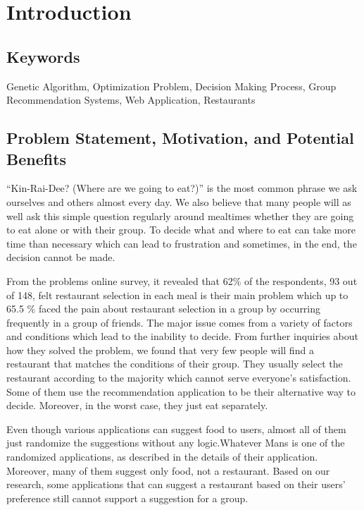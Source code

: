 \documentclass[12pt,oneside,openright,a4paper]{cpe-english-project}
\begin{document}



\chapter{Introduction}

\section{Keywords} 

Genetic Algorithm, Optimization Problem, Decision Making Process, Group Recommendation Systems, Web Application, Restaurants

\section{Problem Statement, Motivation, and Potential Benefits} 

“Kin-Rai-Dee? (Where are we going to eat?)” is the most common phrase we ask ourselves and others almost every day. We also believe that many people will as well ask this simple question regularly around mealtimes whether they are going to eat alone or with their group. To decide what and where to eat can take more time than necessary which can lead to frustration and sometimes, in the end, the decision cannot be made.

From the problems online survey, it revealed that 62\% of the respondents, 93 out of 148, felt restaurant selection in each meal is their main problem which up to 65.5 \% faced the pain about restaurant selection in a group by occurring frequently in a group of friends. The major issue comes from a variety of factors and conditions which lead to the inability to decide. From further inquiries about how they solved the problem, we found that very few people will find a restaurant that matches the conditions of their group. They usually select the restaurant according to the majority which cannot serve everyone’s satisfaction. Some of them use the recommendation application to be their alternative way to decide. Moreover, in the worst case, they just eat separately. 

Even though various applications can suggest food to users, almost all of them just randomize the suggestions without any logic.Whatever Mans is one of the randomized applications, as described in the details of their application. Moreover, many of them suggest only food, not a restaurant. Based on our research, some applications that can suggest a restaurant based on their users’ preference still cannot support a suggestion for a group.
\end{document}
